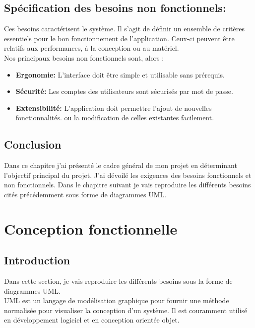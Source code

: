 \documentclass[12pt,a4paper]{report}
\begin{document}
		\section{Spécification des besoins non fonctionnels:}		
Ces besoins caractérisent le système. Il s’agit de définir un ensemble de critères essentiels
pour le bon fonctionnement de l’application. Ceux-ci peuvent être relatifs aux performances, à la
conception ou au matériel.\\
Nos principaux besoins non fonctionnels sont, alors :\\
			\begin{itemize}
				\item \textbf{Ergonomie:} L’interface doit être simple et utilisable sans prérequis.
				\item \textbf{Sécurité:} Les comptes des utilisateurs sont sécurisés par mot de passe.
				\item \textbf{Extensibilité:} L’application doit permettre l’ajout de nouvelles fonctionnalités.
ou la modification de celles existantes facilement.
				\end{itemize}


		\section{Conclusion}
Dans ce chapitre j'ai présenté le cadre général de mon projet en déterminant l’objectif principal du projet. J'ai dévoilé les exigences des besoins fonctionnels et non fonctionnels. Dans le chapitre suivant je vais reproduire les différents besoins cités précédemment sous forme de diagrammes UML.











	\chapter{Conception fonctionnelle}

		
		\section{Introduction}
Dans cette section, je vais reproduire les différents besoins sous la forme de diagrammes UML.\\
UML est un langage de modélisation graphique pour fournir une méthode normalisée pour visualiser la conception d'un système. Il est couramment utilisé en développement logiciel et en conception orientée objet.
		
\end{document}
